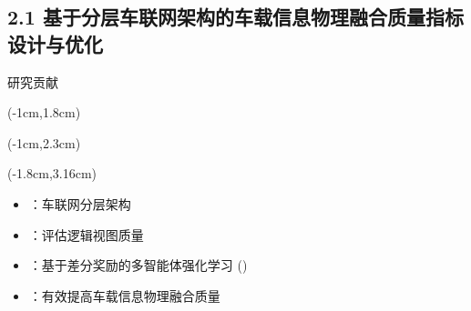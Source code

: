 \subsection[\englishfont 2.1 基于分层车联网架构的车载信息物理融合质量指标设计与优化]{2.1 基于分层车联网架构的车载信息物理融合质量指标设计与优化}

\begin{frame}{研究贡献}
\newBackground
\begin{center}
\begin{textblock*}{\textwidth}(-1cm,1.8cm)
  \small \englishfont \colorbox{cqublue}{\color{white}{创新的服务架构和高效的数据感知与质量}}
\end{textblock*}
\end{center}

\begin{center}
\begin{textblock*}{\textwidth}(-1cm,2.3cm)
  \small \englishfont \colorbox{cqublue}{}
\end{textblock*}
\end{center}

\begin{center}
\begin{textblock*}{\textwidth}(-1.8cm,3.16cm)
\begin{minipage}[t]{0.7\textwidth}
\begin{itemize}[itemsep=0.2\baselineskip] \englishfont
	\item[\ding{111}] {{}：{\color{red}{SDN+MEC}}车联网分层架构}
	\item[\ding{111}]  {{}：{\color{red}{Age of View}}评估逻辑视图质量}
		\begin{itemize}[itemsep=0.2\baselineskip] 
		\end{itemize}
	\item[\ding{111}]  {{}：基于差分奖励的多智能体强化学习 ({\color{red}{MADR}})}
	\item[\ding{111}]  {{}：有效提高车载信息物理融合质量}
\end{itemize}
\end{minipage}
\end{textblock*}
\end{center}


\end{frame}
